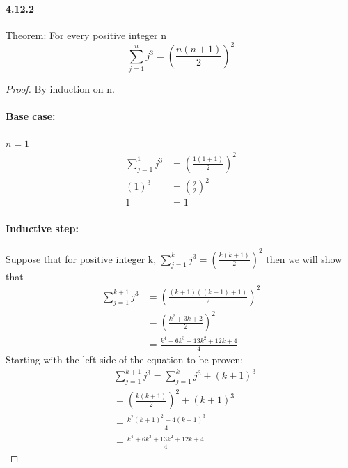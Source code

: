 \documentclass[11pt, letterpaper, twocolumn, fleqn]{article}
\begin{document}
    \paragraph{4.12.2}
        \begin{enumerate}
            \item Theorem: For every positive integer n 
              $$ \sum_{j=1}^{n} j^3 = \left( \frac{n(n+1)}{2} \right) ^2 $$
              \begin{proof} By induction on n.
                \item \paragraph{Base case:} $n=1$
                \begin{align*}
                  \sum_{j=1}^{1} j^3 &= \left( \frac{1(1+1)}{2} \right) ^2 \\
                  (1)^3 &= \left( \frac{2}{2} \right)^2 \\
                  1 &= 1
                \end{align*}
                \item \paragraph{Inductive step:}
                  Suppose that for positive integer k, $\sum_{j=1}^{k} j^3 = \left( \frac{k(k+1)}{2} \right) ^2$ then we will show that 
                  \begin{align*}
                    \sum_{j=1}^{k+1} j^3 &= \left( \frac{(k+1)((k+1)+1)}{2} \right)   ^2 \\
                    &= \left( \frac{k^2+3k+2}{2} \right)^2 \\
                    &= \frac{k^4+6k^3+13k^2+12k+4}{4}
                  \end{align*}
                  Starting with the left side of the equation to be proven:
                  \begin{align*}
                    &\sum_{j=1}^{k+1} j^3 = \sum_{j=1}^{k} j^3 +(k+1)^3  \tag{separate last term}\\
                    &= \left( \frac{k(k+1)}{2} \right) ^2 +(k+1)^3 \tag{inductive hypothesis}\\
                    &= \frac{k^2(k+1)^2 + 4(k+1)^3}{4} \\
                    &= \frac{k^4+6k^3+13k^2+12k+4}{4} \tag{algebra}
                  \end{align*}

\end{proof}
\end{enumerate}
\end{document}
